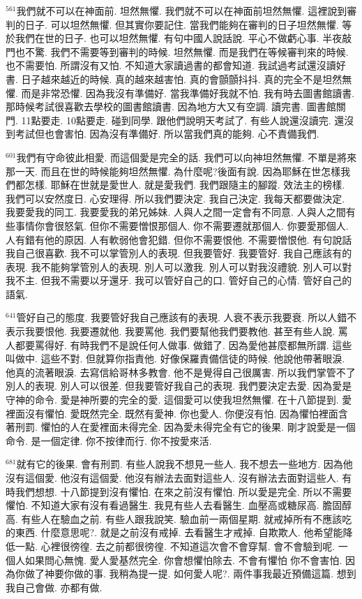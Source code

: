 \documentclass{book}
\begin{document}
$^{561}$我們就不可以在神面前.
坦然無懼.
我們就不可以在神面前坦然無懼.
這裡說到審判的日子.
可以坦然無懼.
但其實你要記住.
當我們能夠在審判的日子坦然無懼.
等於我們在世的日子.
也可以坦然無懼.
有句中國人說話說.
平心不做虧心事.
半夜敲門也不驚.
我們不需要等到審判的時候.
坦然無懼.
而是我們在等候審判來的時候.
也不需要怕.
所謂沒有又怕.
不知道大家讀過書的都會知道.
我試過考試還沒讀好書.
日子越來越近的時候.
真的越來越害怕.
真的會顫顫抖抖.
真的完全不是坦然無懼.
而是非常恐懼.
因為我沒有準備好.
當我準備好我就不怕.
我有時去圖書館讀書.
那時候考試很喜歡去學校的圖書館讀書.
因為地方大又有空調.
讀完書.
圖書館關門.
11點要走.
10點要走.
碰到同學.
跟他們說明天考試了.
有些人說還沒讀完.
還沒到考試但也會害怕.
因為沒有準備好.
所以當我們真的能夠.
心不責備我們.

$^{601}$我們有守命彼此相愛.
而這個愛是完全的話.
我們可以向神坦然無懼.
不單是將來那一天.
而且在世的時候能夠坦然無懼.
為什麼呢?後面有說.
因為耶穌在世怎樣我們都怎樣.
耶穌在世就是愛世人.
就是愛我們.
我們跟隨主的腳蹤.
效法主的榜樣.
我們可以安然度日.
心安理得.
所以我們要決定.
我自己決定.
我每天都要做決定.
我要愛我的同工.
我要愛我的弟兄姊妹.
人與人之間一定會有不同意.
人與人之間有些事情你會很怒氣.
但你不需要憎恨那個人.
你不需要遷就那個人.
你要愛那個人.
人有錯有他的原因.
人有軟弱他會犯錯.
但你不需要恨他.
不需要憎恨他.
有句說話我自己很喜歡.
我不可以掌管別人的表現.
但我要管好.
我要管好.
我自己應該有的表現.
我不能夠掌管別人的表現.
別人可以激我.
別人可以對我沒禮貌.
別人可以對我不主.
但我不需要以牙還牙.
我可以管好自己的口.
管好自己的心情.
管好自己的語氣.

$^{641}$管好自己的態度.
我要管好我自己應該有的表現.
人衰不表示我要衰.
所以人錯不表示我要恨他.
我要遷就他.
我要罵他.
我們要幫他我們要教他.
甚至有些人說.
罵人都要罵得好.
有時我們不是說任何人做事.
做錯了.
因為愛他甚麼都無所謂.
這些叫做中.
這些不對.
但就算你指責他.
好像保羅責備信徒的時候.
他說他帶著眼淚.
他真的流著眼淚.
去寫信給哥林多教會.
他不是覺得自己很厲害.
所以我們掌管不了別人的表現.
別人可以很差.
但我要管好我自己的表現.
我們要決定去愛.
因為愛是守神的命令.
愛是神所要的完全的愛.
這個愛可以使我坦然無懼.
在十八節提到.
愛裡面沒有懼怕.
愛既然完全.
既然有愛神.
你也愛人.
你便沒有怕.
因為懼怕裡面含著刑罰.
懼怕的人在愛裡面未得完全.
因為愛未得完全有它的後果.
剛才說愛是一個命令.
是一個定律.
你不按律而行.
你不按愛來活.

$^{681}$就有它的後果.
會有刑罰.
有些人說我不想見一些人.
我不想去一些地方.
因為他沒有這個愛.
他沒有這個愛.
他沒有辦法去面對這些人.
沒有辦法去面對這些人.
有時我們想想.
十八節提到沒有懼怕.
在來之前沒有懼怕.
所以愛是完全.
所以不需要懼怕.
不知道大家有沒有看過醫生.
我見有些人去看醫生.
血壓高或糖尿高.
膽固醇高.
有些人在驗血之前.
有些人跟我說笑.
驗血前一兩個星期.
就戒掉所有不應該吃的東西.
什麼意思呢?.
就是之前沒有戒掉.
去看醫生才戒掉.
自欺欺人.
他希望能降低一點.
心裡很徬徨.
去之前都很徬徨.
不知道這次會不會穿幫.
會不會驗到呢.
一個人如果問心無愧.
愛人愛基然完全.
你會想懼怕除去.
不會有懼怕 你不會害怕.
因為你做了神要你做的事.
我稍為提一提.
如何愛人呢?.
兩件事我最近預備這篇.
想到我自己會做.
亦都有做.
\end{document}
